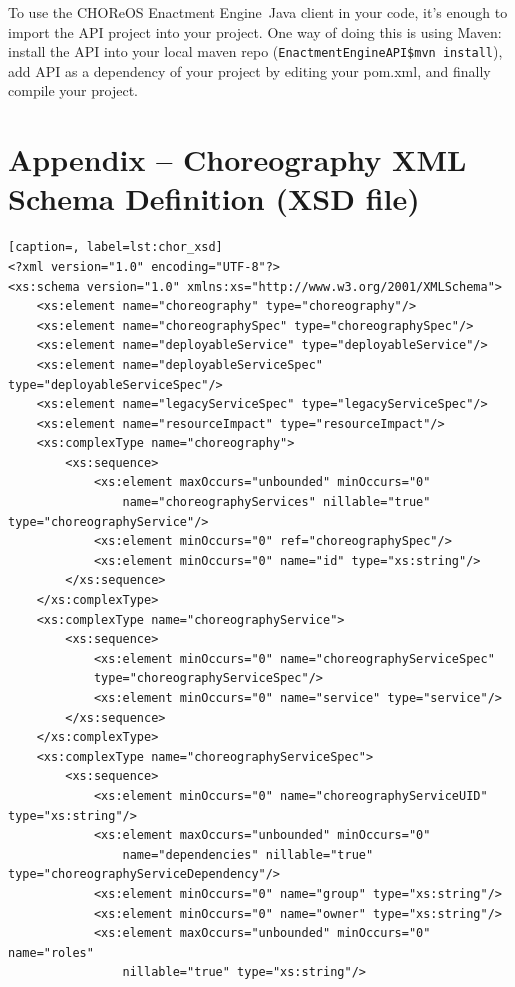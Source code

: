 \documentclass[a4paper, 10pt]{article}
\newcommand{\ee}{CHOReOS Enactment Engine}
\begin{document}
To use the \ee\ Java client in your code, it's enough to import the API project into your project. One way of doing this is using Maven: install the API into your local maven repo (\texttt{EnactmentEngineAPI\$mvn install}), add API as a dependency of your project by editing your pom.xml, and finally compile your project.

\section*{Appendix -- Choreography XML Schema Definition (XSD file)}

{\footnotesize

\lstset{language=XML}

\begin{lstlisting}[caption=, label=lst:chor_xsd]
<?xml version="1.0" encoding="UTF-8"?>
<xs:schema version="1.0" xmlns:xs="http://www.w3.org/2001/XMLSchema">
    <xs:element name="choreography" type="choreography"/>
    <xs:element name="choreographySpec" type="choreographySpec"/>
    <xs:element name="deployableService" type="deployableService"/>
    <xs:element name="deployableServiceSpec" type="deployableServiceSpec"/>
    <xs:element name="legacyServiceSpec" type="legacyServiceSpec"/>
    <xs:element name="resourceImpact" type="resourceImpact"/>
    <xs:complexType name="choreography">
        <xs:sequence>
            <xs:element maxOccurs="unbounded" minOccurs="0"
                name="choreographyServices" nillable="true" type="choreographyService"/>
            <xs:element minOccurs="0" ref="choreographySpec"/>
            <xs:element minOccurs="0" name="id" type="xs:string"/>
        </xs:sequence>
    </xs:complexType>
    <xs:complexType name="choreographyService">
        <xs:sequence>
            <xs:element minOccurs="0" name="choreographyServiceSpec" 
            type="choreographyServiceSpec"/>
            <xs:element minOccurs="0" name="service" type="service"/>
        </xs:sequence>
    </xs:complexType>
    <xs:complexType name="choreographyServiceSpec">
        <xs:sequence>
            <xs:element minOccurs="0" name="choreographyServiceUID" type="xs:string"/>
            <xs:element maxOccurs="unbounded" minOccurs="0"
                name="dependencies" nillable="true" type="choreographyServiceDependency"/>
            <xs:element minOccurs="0" name="group" type="xs:string"/>
            <xs:element minOccurs="0" name="owner" type="xs:string"/>
            <xs:element maxOccurs="unbounded" minOccurs="0" name="roles"
                nillable="true" type="xs:string"/>

\end{lstlisting}}
\end{document}
